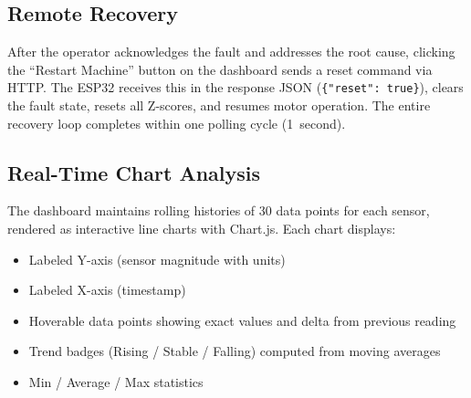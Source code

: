 \documentclass[conference]{IEEEtran}
\begin{document}
\vspace{0.3cm}
\noindent{}
\vspace{0.2cm}

\vspace{0.3cm}
\noindent{}
\vspace{0.2cm}

\subsection{Remote Recovery}

After the operator acknowledges the fault and addresses the root cause, clicking the ``Restart Machine'' button on the dashboard sends a reset command via HTTP. The ESP32 receives this in the response JSON (\texttt{\{"reset": true\}}), clears the fault state, resets all Z-scores, and resumes motor operation. The entire recovery loop completes within one polling cycle (1~second).

\subsection{Real-Time Chart Analysis}

The dashboard maintains rolling histories of 30 data points for each sensor, rendered as interactive line charts with Chart.js. Each chart displays:
\begin{itemize}
    \item Labeled Y-axis (sensor magnitude with units)
    \item Labeled X-axis (timestamp)
    \item Hoverable data points showing exact values and delta from previous reading
    \item Trend badges (Rising / Stable / Falling) computed from moving averages
    \item Min / Average / Max statistics
\end{itemize}
\end{document}
